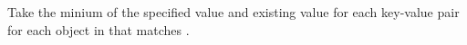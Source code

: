 Take the minium of the specified value and existing value for each key-value
pair for each object in  that matches .


